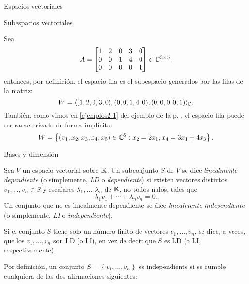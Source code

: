 \begin{chapter}{Espacios vectoriales}
\begin{section}{Subespacios vectoriales}
    \begin{ejemplo*}
        Sea
        $$
        A = \begin{bmatrix}
        1&2&0&3&0\\ 0&0&1&4&0 \\0&0&0&0&1
        \end{bmatrix} \in \mathbb C^{3 \times 5},
        $$
        entonces, por definición, el espacio fila es el subespacio generados por las filas de la matriz: 
        $$
        W = \langle  (1,2,0,3,0), (0,0,1,4,0), (0,0,0,0,1) \rangle_\mathbb C.
        $$ 
        También, como vimos en \ref{ejemplos2-1} del ejemplo de la p. \pageref{ejemplos2}, el espacio fila puede ser caracterizado de forma implícita:
        \begin{align*}
        W =\left\{(x_1,x_2,x_3,x_4,x_5)\in \mathbb C^5: x_2 = 2x_1, x_4 = 3x_1+4x_3 \right\}.
        \end{align*}
    \end{ejemplo*}
\end{section}		
        
\begin{section}{Bases y dimensi\'on}\label{seccion-bases-y-dimension}
    \begin{definicion}
        Sea $V$ un espacio vectorial sobre $\mathbb K$. Un subconjunto $S$ de $V$ se dice \textit{linealmente dependiente} (o simplemente, \textit{LD} o \textit{dependiente}) si existen vectores distintos $v_1,\ldots,v_n \in S$  y escalares $\lambda_1,\ldots,\lambda_n$ de $\mathbb K$, no todos nulos, tales que 	
        \begin{equation*}
            \lambda_1v_1+\cdots+\lambda_nv_n=0.
        \end{equation*}
        Un conjunto que no es linealmente dependiente se dice \textit{linealmente independiente} (o simplemente, \textit{LI} o \textit{independiente}).
        
        Si el conjunto $S$ tiene solo un número finito de vectores $v_1,\ldots,v_n$, se dice,
        a veces, que los $v_1,\ldots,v_n$ son LD (o LI), en vez de decir
        que $S$ es LD (o LI, respectivamente).
        
    \end{definicion}

\begin{observacion*} Por definición, un conjunto $S = \left\{v_1,\ldots,v_n \right\}$ es independiente si se cumple cualquiera de las dos afirmaciones siguientes:
	

\end{observacion*}
\end{section}
\end{chapter}
